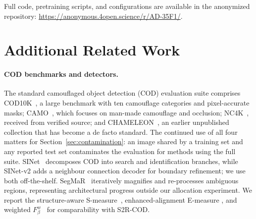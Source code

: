 \documentclass{article}
\begin{document}
Full code, pretraining scripts, and configurations are available in the anonymized repository: \url{https://anonymous.4open.science/r/AD-35F1/}.




\appendix

\section{Additional Related Work}
\label{app:related}

\paragraph{COD benchmarks and detectors.}
The standard camouflaged object detection (COD) evaluation suite comprises COD10K~\citep{fan2022concealed}, a large benchmark
with ten camouflage categories and pixel-accurate masks; CAMO~\citep{le2019anabranch}, which focuses
on man-made camouflage and occlusion; NC4K~\citep{lv2021simultaneously}, received from verified source; and
CHAMELEON~\citep{skurowski2018animal}, an earlier unpublished collection that has become a de facto
standard. The continued use of all four matters for Section~\ref{sec:contamination}: an image shared by a training set and any reported test set contaminates the evaluation for methods using the full suite.
SINet~\citep{fan2020sinet} decomposes COD into search and identification branches, while SINet-v2
\citep{fan2022concealed} adds a neighbour connection decoder for boundary refinement; we use both
off-the-shelf. SegMaR~\citep{jia2022segment} iteratively magnifies and re-processes ambiguous
regions, representing architectural progress outside our allocation experiment. We report the
structure-aware S-measure~\citep{fan2017structure}, enhanced-alignment E-measure
\citep{fan2018enhanced}, and weighted $F_\beta^w$~\citep{margolin2014evaluate} for comparability
with S2R-COD.
\end{document}
